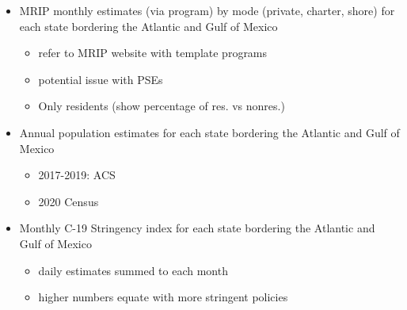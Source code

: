\documentclass[10pt,letterpaper]{article}
\providecommand{\tightlist}{%
  \setlength{\itemsep}{0pt}\setlength{\parskip}{0pt}}
\begin{document}
\begin{itemize}
\tightlist
\item
  MRIP monthly estimates (via program) by mode (private, charter, shore)
  for each state bordering the Atlantic and Gulf of Mexico

  \begin{itemize}
  \tightlist
  \item
    refer to MRIP website with template programs
  \item
    potential issue with PSEs
  \item
    Only residents (show percentage of res. vs nonres.)
  \end{itemize}
\item
  Annual population estimates for each state bordering the Atlantic and
  Gulf of Mexico

  \begin{itemize}
  \tightlist
  \item
    2017-2019: ACS
  \item
    2020 Census
  \end{itemize}
\item
  Monthly C-19 Stringency index for each state bordering the Atlantic
  and Gulf of Mexico

  \begin{itemize}
  \tightlist
  \item
    daily estimates summed to each month
  \item
    higher numbers equate with more stringent policies
  \end{itemize}
\end{itemize}
\end{document}
